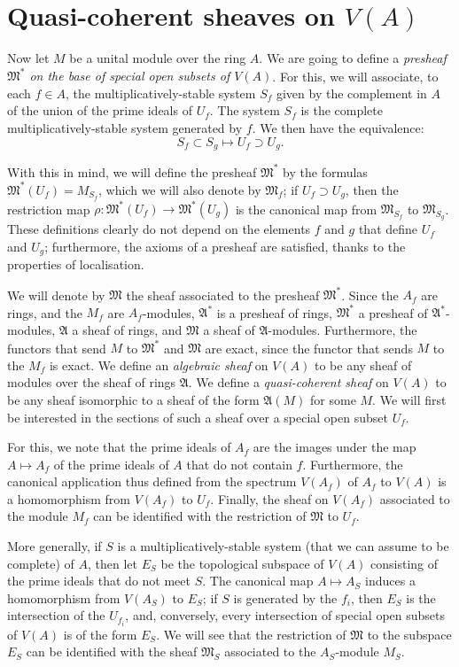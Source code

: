 \documentclass{article}
\theoremstyle{plain}
\newcommand{\sh}{\mathfrak}
\newcommand{\oldpage}[1]{\marginpar{\footnotesize$\Big\vert$ \textit{p.~#1}}}
\begin{document}
\section{Quasi-coherent sheaves on $V(A)$}
\label{section3}

Now let $M$ be a unital module over the ring $A$.
We are going to define a \emph{presheaf $\sh{M}^*$ on the base of special open subsets of $V(A)$}.
For this, we will associate, to each $f\in A$, the multiplicatively-stable system $S_f$ given by the complement in $A$ of the union of the prime ideals of $U_f$.
The system $S_f$ is the complete multiplicatively-stable system generated by $f$.
We then have the equivalence:
\[
  S_f \subset S_g \mapsto U_f \supset U_g.
\]

With this in mind, we will define the presheaf $\sh{M}^*$ by the formulas $\sh{M}^*(U_f)=M_{S_f}$, which we will also denote by $\sh{M}_f$;
if $U_f\supset U_g$, then the restriction map $\rho\colon\sh{M}^*(U_f)\to\sh{M}^*(U_g)$ is the canonical map from $\sh{M}_{S_f}$ to $\sh{M}_{S_g}$.
These definitions clearly do not depend on the elements $f$ and $g$ that define $U_f$ and $U_g$;
furthermore, the axioms of a presheaf are satisfied, thanks to the properties of localisation.

We will denote by $\sh{M}$ the sheaf associated to the presheaf $\sh{M}^*$.
Since the $A_f$ are rings, and the $M_f$ are $A_f$-modules, $\sh{A}^*$ is a presheaf of rings, $\sh{M}^*$ a presheaf of $\sh{A}^*$-modules, $\sh{A}$ a sheaf of rings, and $\sh{M}$ a sheaf of $\sh{A}$-modules.
Furthermore, the functors that send $M$ to $\sh{M}^*$ and $\sh{M}$ are exact, since the functor that sends $M$ to the $M_f$ is exact.
We define an \emph{algebraic sheaf} on $V(A)$ to be any sheaf of modules over the sheaf of rings $\sh{A}$.
We define a \emph{quasi-coherent sheaf} on $V(A)$ to be any sheaf isomorphic to a sheaf of the form $\sh{A}(M)$ for some $M$.
We will first be interested in the sections of such a sheaf over a special open subset $U_f$.

For this, we note that the prime ideals of $A_f$ are the images under the map $A\mapsto A_f$ of the prime ideals of $A$ that do not contain $f$.
Furthermore, the canonical application thus defined from the spectrum $V(A_f)$ of $A_f$ to $V(A)$ is a homomorphism from $V(A_f)$ to $U_f$.
Finally, the sheaf on $V(A_f)$ associated to the module $M_f$ can be identified with the restriction of $\sh{M}$ to $U_f$.

More generally, if $S$ is a multiplicatively-stable system (that we can assume to be complete) of $A$, then let $E_S$ be the topological subspace of $V(A)$ consisting of the prime ideals that do not meet $S$.
The canonical map $A\mapsto A_S$ induces a homomorphism from $V(A_S)$ to $E_S$;
if $S$ is generated by the $f_i$,
\oldpage{1-05}
then $E_S$ is the intersection of the $U_{f_i}$, and, conversely, every intersection of special open subsets of $V(A)$ is of the form $E_S$.
We will see that the restriction of $\sh{M}$ to the subspace $E_S$ can be identified with the sheaf $\sh{M}_S$ associated to the $A_S$-module $M_S$.
\end{document}
